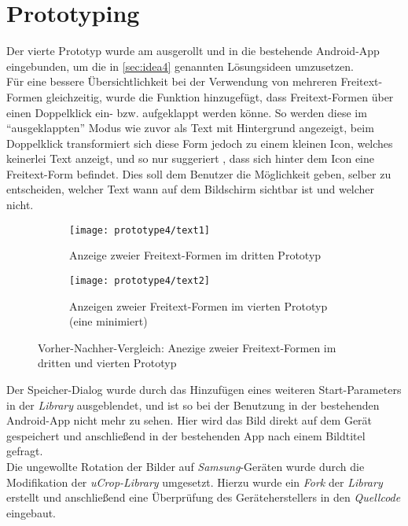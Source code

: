 \section{Prototyping}
Der vierte Prototyp wurde am  ausgerollt und in die bestehende Android-App eingebunden, um die in \autoref{sec:idea4} genannten Lösungsideen umzusetzen. \\

Für eine bessere Übersichtlichkeit bei der Verwendung von mehreren Freitext-Formen gleichzeitig, wurde die Funktion hinzugefügt, dass Freitext-Formen über einen Doppelklick ein- bzw. aufgeklappt werden könne.
So werden diese im ``ausgeklappten'' Modus wie zuvor als Text mit Hintergrund angezeigt, beim Doppelklick transformiert sich diese Form jedoch zu einem kleinen Icon, welches keinerlei Text anzeigt, und so nur suggeriert , dass sich hinter dem Icon eine Freitext-Form befindet. 
Dies soll dem Benutzer die Möglichkeit geben, selber zu entscheiden, welcher Text wann auf dem Bildschirm sichtbar ist und welcher nicht. \\

\begin{figure}[h]
  \centering
  \begin{subfigure}[t]{0.4\textwidth}
    \texttt{[image: prototype4/text1]}
    \caption{Anzeige zweier Freitext-Formen im dritten Prototyp}
  \end{subfigure}
  \begin{subfigure}[t]{0.4\textwidth}
    \texttt{[image: prototype4/text2]}
    \caption{Anzeigen zweier Freitext-Formen im vierten Prototyp (eine minimiert)}
  \end{subfigure}
  \caption{Vorher-Nachher-Vergleich: Anezige zweier Freitext-Formen im dritten und vierten Prototyp}
  \label{fig:texts}
\end{figure}

Der Speicher-Dialog wurde durch das Hinzufügen eines weiteren Start-Parameters in der \emph{Library} ausgeblendet, und ist so bei der Benutzung in der bestehenden Android-App nicht mehr zu sehen.
Hier wird das Bild direkt auf dem Gerät gespeichert und anschließend in der bestehenden App nach einem Bildtitel gefragt. \\

Die ungewollte Rotation der Bilder auf \emph{Samsung}-Geräten wurde durch die Modifikation der \emph{uCrop-Library} umgesetzt.
Hierzu wurde ein \emph{Fork} der \emph{Library} erstellt und anschließend eine Überprüfung des Geräteherstellers in den \emph{Quellcode} eingebaut.

